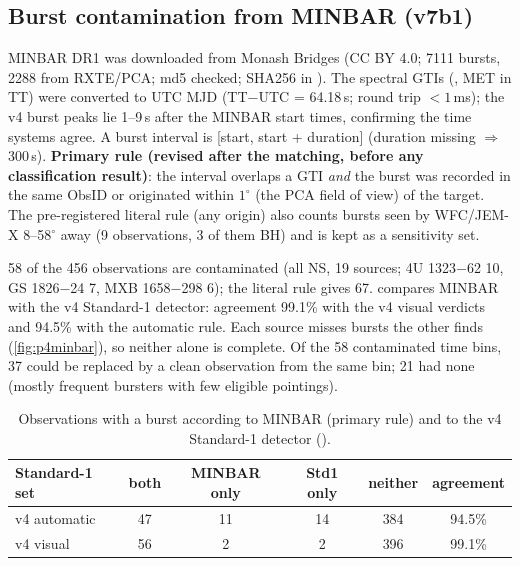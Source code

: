 \subsection{Burst contamination from MINBAR (v7b1)}
MINBAR DR1 \citep{Galloway2020} was downloaded from Monash Bridges (CC BY 4.0; 7111 bursts, 2288 from RXTE/PCA; md5
checked; SHA256 in ). The spectral GTIs (, MET in TT) were converted to UTC MJD
(TT$-$UTC = 64.18\,s; round trip $<1$\,ms); the v4 burst peaks lie 1--9\,s after the MINBAR start times, confirming the
time systems agree. A burst interval is [start, start + duration] (duration missing $\Rightarrow$ 300\,s). \textbf{Primary rule
(revised after the matching, before any classification result)}: the interval overlaps a GTI \emph{and} the burst was
recorded in the same ObsID or originated within $1^\circ$ (the PCA field of view) of the target. The pre-registered literal
rule (any origin) also counts bursts seen by WFC/JEM-X 8--58$^\circ$ away (9 observations, 3 of them BH) and is kept as a
sensitivity set.

58 of the 456 observations are contaminated (all NS, 19 sources; 4U 1323$-$62 10, GS 1826$-$24 7, MXB 1658$-$298 6); the
literal rule gives 67.  compares MINBAR with the v4 Standard-1 detector: agreement 99.1\% with the v4
visual verdicts and 94.5\% with the automatic rule. Each source misses bursts the other finds (\cref{fig:p4minbar}), so
neither alone is complete. Of the 58 contaminated time bins, 37 could be replaced by a clean observation from the same
bin; 21 had none (mostly frequent bursters with few eligible pointings).

\begin{table}[htbp]
\centering\small
\caption[MINBAR vs Standard-1 bursts]{Observations with a burst according to MINBAR (primary rule) and to the v4
Standard-1 detector ().}
\label{tab:p4minbaragree}
\begin{tabular}{@{}lccccc@{}}
\toprule
Standard-1 set & both & MINBAR only & Std1 only & neither & agreement \\
\midrule
v4 automatic & 47 & 11 & 14 & 384 & 94.5\% \\
v4 visual & 56 & 2 & 2 & 396 & 99.1\% \\
\bottomrule
\end{tabular}
\end{table}

